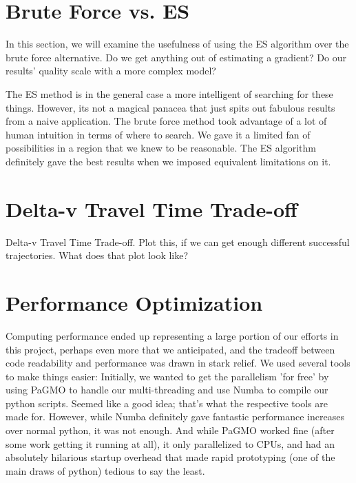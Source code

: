 

\section{Brute Force vs. ES}
In this section, we will examine the usefulness of using the ES algorithm over the brute force alternative. Do we get anything out of estimating a gradient? Do our results’ quality scale with a more complex model?

The ES method is in the general case a more intelligent of searching for these things. However, its not a magical panacea that just spits out fabulous results from a naive application. The brute force method took advantage of a lot of human intuition in terms of where to search. We gave it a limited fan of possibilities in a region that we knew to be reasonable. The ES algorithm definitely gave the best results when we imposed equivalent limitations on it.

\section{Delta-v Travel Time Trade-off}
Delta-v Travel Time Trade-off. Plot this, if we can get enough different successful trajectories. What does that plot look like?

\section{Performance Optimization}
Computing performance ended up representing a large portion of our efforts in this project, perhaps even more that we anticipated, and the tradeoff between code readability and performance was drawn in stark relief. We used several tools to make things easier: Initially, we wanted to get the parallelism 'for free' by using PaGMO to handle our multi-threading and use Numba to compile our python scripts. Seemed like a good idea; that's what the respective tools are made for. However, while Numba definitely gave fantastic performance increases over normal python, it was not enough. And while PaGMO worked fine (after some work getting it running at all), it only parallelized to CPUs, and had an absolutely hilarious startup overhead that made rapid prototyping (one of the main draws of python) tedious to say the least. 

